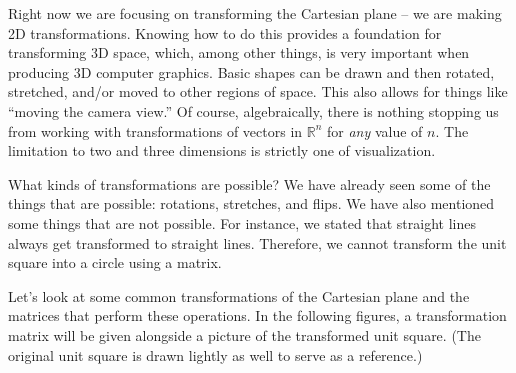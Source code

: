 {%
\begin{myfigure}
\begin{center}
\end{center}
\label{fig:transf_2_2}
\end{myfigure}
\baselineskip}

\medskip

Right now we are focusing on transforming the Cartesian plane -- we are making 2D transformations. Knowing how to do this provides a foundation for transforming 3D space, which, among other things, is very important when producing 3D computer graphics. Basic shapes can be drawn and then rotated, stretched, and/or moved to other regions of space. This also allows for things like ``moving the camera view.'' Of course, algebraically, there is nothing stopping us from working with transformations of vectors in $\mathbb{R}^n$ for \textit{any} value of $n$. The limitation to two and three dimensions is strictly one of visualization.

What kinds of transformations are possible? We have already seen some of the things that are possible: rotations, stretches, and flips. We have also mentioned some things that are not possible. For instance, we stated that straight lines always get transformed to straight lines. Therefore, we cannot transform the unit square into a circle using a matrix.

Let's look at some common transformations of the Cartesian plane and the matrices that perform these operations. In the following figures, a transformation matrix will be given alongside a picture of the transformed unit square. (The original unit square is drawn lightly as well to serve as a reference.)\\

